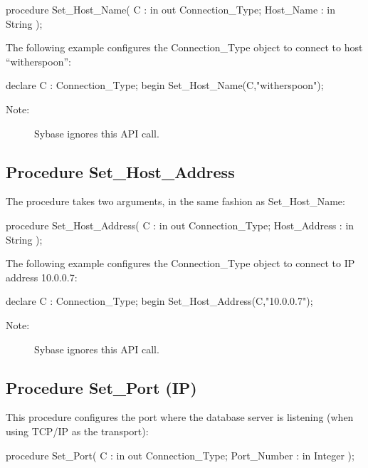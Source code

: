 \documentclass[english,letterpaper]{book}
\begin{document}
\begin{Code}
procedure Set_Host_Name(
   C :         in out Connection_Type;
   Host_Name : in     String
);
\end{Code}

The following example configures the Connection\_Type object to connect
to host ``witherspoon'':

\begin{Example}
declare
   C : Connection_Type;
begin
   Set_Host_Name(C,"witherspoon");
\end{Example}

\begin{description}
\item [Note:]Sybase ignores this API call.
\end{description}

\subsection{Procedure Set\_Host\_Address}

The procedure takes two arguments, in the same fashion as Set\_Host\_Name:

\begin{Code}
procedure Set_Host_Address(
   C :            in out Connection_Type;
   Host_Address : in     String
);
\end{Code}

The following example configures the Connection\_Type object to connect
to IP address 10.0.0.7:

\begin{Example}
declare
   C : Connection_Type;
begin
   Set_Host_Address(C,"10.0.0.7");
\end{Example}

\begin{description}
\item [Note:]Sybase ignores this API call.
\end{description}

\subsection{Procedure Set\_Port (IP)}

This procedure configures the port where the database
server is listening (when using TCP/IP
as the transport):

\begin{Code}
procedure Set_Port(
   C :           in out Connection_Type;
   Port_Number : in     Integer
);
\end{Code}
\end{document}
